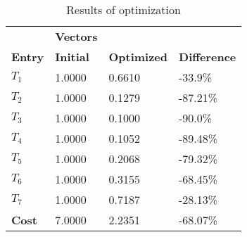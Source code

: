 \begin{table}[H]
\centering
\begin{tabular}{llll}
\textbf{}      & \cellcolor[HTML]{EFEFEF}\textbf{Vectors} & \textbf{} & \textbf{}         \\
\rowcolor[HTML]{EFEFEF} 
\textbf{Entry} & \textbf{Initial} & \textbf{Optimized} & \textbf{Difference} \\
$T_1$ & 1.0000 & 0.6610 & -33.9\% \\ 
$T_2$ & 1.0000 & 0.1279 & -87.21\% \\ 
$T_3$ & 1.0000 & 0.1000 & -90.0\% \\ 
$T_4$ & 1.0000 & 0.1052 & -89.48\% \\ 
$T_5$ & 1.0000 & 0.2068 & -79.32\% \\ 
$T_6$ & 1.0000 & 0.3155 & -68.45\% \\ 
$T_7$ & 1.0000 & 0.7187 & -28.13\% \\ 
\rowcolor[HTML]{EFEFEF} 
\textbf{Cost}  & 7.0000 & 2.2351 & -68.07\% \\ 
\end{tabular}
\caption{Results of optimization}
\label{tab:OptimizationAnalysis}
\end{table}